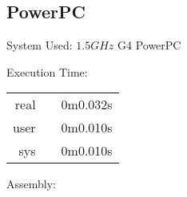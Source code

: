 \documentclass[a4paper,12pt]{article}
\begin{document}
\section{}

\subsection*{PowerPC}

System Used: 	$1.5GHz$	G4 PowerPC

Execution Time:

\begin{tabular}{rrr}
real 	&		&	0m0.032s		\\	
user 	&		&	0m0.010s		\\
sys	&		&	0m0.010s		\\
\end{tabular}

Assembly:
\end{document}
